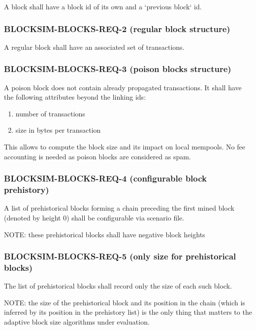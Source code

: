 \documentclass{scrreprt}
\begin{document}
        A block shall have a block id of its own and a `previous block` id.

      \subsubsection{BLOCKSIM-BLOCKS-REQ-2 (regular block structure)}

        A regular block shall have an associated set of transactions.

      \subsubsection{BLOCKSIM-BLOCKS-REQ-3 (poison blocks structure)}

        A poison block does not contain already propagated transactions.
        It shall have the following attributes beyond the linking ids:

        \begin{enumerate}
          \item number of transactions
          \item size in bytes per transaction
        \end{enumerate}

        This allows to compute the block size and its impact on local
        mempools. No fee accounting is needed as poison blocks are
        considered as spam.

      \subsubsection{BLOCKSIM-BLOCKS-REQ-4 (configurable block prehistory)}

        A list of prehistorical blocks forming a chain preceding the first
        mined block (denoted by height 0) shall be configurable via
        scenario file.

        NOTE: these prehistorical blocks shall have negative block heights

      \subsubsection{BLOCKSIM-BLOCKS-REQ-5 (only size for prehistorical blocks)}

        The list of prehistorical blocks shall record only the size of each
        such block.

        NOTE: the size of the prehistorical block and its position in the chain
        (which is inferred by its position in the prehistory list) is the only
        thing that matters to the adaptive block size algorithms under evaluation.
\end{document}
